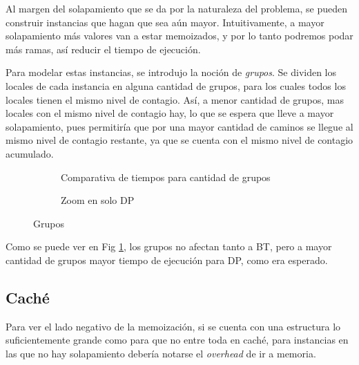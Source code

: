 Al margen del solapamiento que se da por la naturaleza del problema, se pueden construir instancias que hagan que sea aún mayor. Intuitivamente, a mayor solapamiento más valores van a estar memoizados, y por lo tanto podremos podar más ramas, así reducir el tiempo de ejecución.

Para modelar estas instancias, se introdujo la noción de \textit{grupos}. Se dividen los locales de cada instancia en alguna cantidad de grupos, para los cuales todos los locales tienen el mismo nivel de contagio. Así, a menor cantidad de grupos, mas locales con el mismo nivel de contagio hay, lo que se espera que lleve a mayor solapamiento, pues permitiría que por una mayor cantidad de caminos se llegue al mismo nivel de contagio restante, ya que se cuenta con el mismo nivel de contagio acumulado.

\begin{figure}[H]
    \centering
    \begin{subfigure}[b]{0.45\textwidth}
        
        \caption{Comparativa de tiempos para cantidad de grupos}
    \end{subfigure}
    \begin{subfigure}[b]{0.45\textwidth}
        
        \caption{Zoom en solo DP}
    \end{subfigure}
    \caption{Grupos}
    \label{fig:grupos}
\end{figure}

Como se puede ver en Fig \ref{fig:grupos}, los grupos no afectan tanto a BT, pero a mayor cantidad de grupos mayor tiempo de ejecución para DP, como era esperado.


\subsection{Caché}

Para ver el lado negativo de la memoización, si se cuenta con una estructura lo suficientemente grande como para que no entre toda en caché, para instancias en las que no hay solapamiento debería notarse el \textit{overhead} de ir a memoria.

